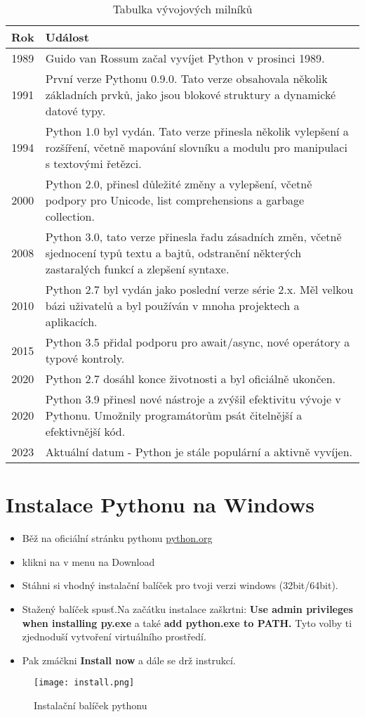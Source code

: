 \documentclass[12pt,a4paper]{article}
\begin{document}
\begin{table}[htbp]
\centering
\caption{Tabulka vývojových milníků}
\label{tab:python-history}
\begin{tabular}{|c|p{7cm}|}
\hline
\textbf{Rok} & \textbf{Událost} \\
\hline
1989 &  Guido van Rossum začal vyvíjet Python v prosinci 1989. \\
\hline
1991 & První verze Pythonu 0.9.0. Tato verze obsahovala několik základních prvků, jako jsou blokové struktury a dynamické datové typy. \\
\hline
1994 & Python 1.0 byl vydán. Tato verze přinesla několik vylepšení a rozšíření, včetně mapování slovníku a modulu pro manipulaci s textovými řetězci. \\
\hline
2000 & Python 2.0, přinesl důležité změny a vylepšení, včetně podpory pro Unicode, list comprehensions a garbage collection. \\
\hline
2008 & Python 3.0, tato verze přinesla řadu zásadních změn, včetně sjednocení typů textu a bajtů, odstranění některých zastaralých funkcí a zlepšení syntaxe. \\
\hline
2010 & Python 2.7 byl vydán jako poslední verze série 2.x. Měl velkou bázi uživatelů a byl používán v mnoha projektech a aplikacích. \\
\hline
2015 & Python 3.5 přidal podporu pro await/async, nové operátory a typové kontroly. \\
\hline
2020 & Python 2.7 dosáhl konce životnosti a byl oficiálně ukončen. \\
\hline
2020 & Python 3.9 přinesl nové nástroje a zvýšil efektivitu vývoje v Pythonu. Umožnily programátorům psát čitelnější a efektivnější kód. \\
\hline
2023 & Aktuální datum - Python je stále populární a aktivně vyvíjen. \\
\hline
\end{tabular}
\end{table}
\section{Instalace Pythonu na Windows}
\begin{itemize}
    \item Běž na oficiální stránku pythonu \href{https://www.python.org/}{python.org}
    \item klikni na v menu na Download
    \item Stáhni si vhodný instalační balíček pro tvoji verzi windows (32bit/64bit).

    \item Stažený balíček spusť.Na začátku instalace zaškrtni:
            \textbf{Use admin privileges when installing py.exe} a také \textbf{add python.exe to PATH.} Tyto volby ti zjednoduší vytvoření virtuálního prostředí.
    \item Pak zmáčkni \textbf{Install now} a dále se drž instrukcí.

\end{itemize}
\begin{figure}[h]
    \centering
    \texttt{[image: install.png]}
    \caption{Instalační balíček pythonu}
    \label{fig:enter-label}
\end{figure}
\end{document}

